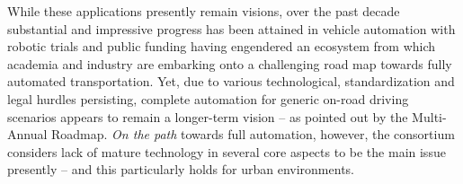 While these applications presently remain visions, over the past decade substantial and impressive progress has been attained in vehicle automation with robotic trials and public funding having engendered an ecosystem from which academia and industry are embarking onto a challenging road map towards fully automated transportation. Yet, due to various technological, standardization and legal hurdles persisting, complete automation for generic on-road driving scenarios appears to remain a longer-term vision -- as pointed out by the Multi-Annual Roadmap. \emph{On the path} towards full automation, however, the \Project consortium considers lack of mature technology in several core aspects to be the main issue presently -- and this particularly holds for urban environments. %

%


